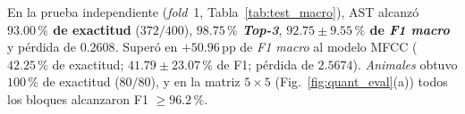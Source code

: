 \documentclass[letterpaper, 10 pt, conference]{ieeeconf}
\begin{document}
\begin{table}[!t]
\centering
\caption{Desempeño en prueba (\textit{fold}~1, $n=400$) por macro-categoría ($80$ clips c/u) y global en $50$ clases.}
\label{tab:test_macro}
\renewcommand{\arraystretch}{0.95}
\setlength{\tabcolsep}{3.4pt}
\end{table}

En la prueba independiente (\textit{fold}~1, Tabla~\ref{tab:test_macro}), AST alcanzó \textbf{$93.00\,\%$ de exactitud} ($372/400$), \textbf{$98.75\,\%$ \textit{Top-3}}, \textbf{$92.75 \pm 9.55\,\%$ de \textit{F1 macro}} y pérdida de $0.2608$. Superó en $+50.96\,\text{pp}$ de \textit{F1 macro} al modelo MFCC ($42.25\,\%$ de exactitud; $41.79 \pm 23.07\,\%$ de F1; pérdida de $2.5674$). \textit{Animales} obtuvo $100\,\%$ de exactitud ($80/80$), y en la matriz $5\times 5$ (Fig.~\ref{fig:quant_eval}(a)) todos los bloques alcanzaron F1 $\geq 96.2\,\%$.
\end{document}
